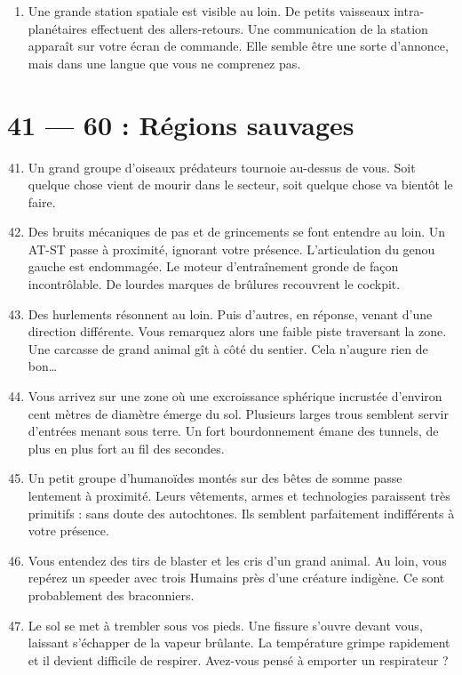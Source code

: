 \documentclass{article}
\begin{document}
\begin{enumerate}
	\item Une grande station spatiale est visible au loin. De petits vaisseaux intra-planétaires effectuent des allers-retours. Une communication de la station apparaît sur votre écran de commande. Elle semble être une sorte d’annonce, mais dans une langue que vous ne comprenez pas.
\end{enumerate}

\section*{41 --- 60 : Régions sauvages}
\begin{enumerate}
	\setcounter{enumi}{40}
	\item Un grand groupe d’oiseaux prédateurs tournoie au-dessus de vous. Soit quelque chose vient de mourir dans le secteur, soit quelque chose va bientôt le faire.
	\item Des bruits mécaniques de pas et de grincements se font entendre au loin. Un AT-ST passe à proximité, ignorant votre présence. L’articulation du genou gauche est endommagée. Le moteur d’entraînement gronde de façon incontrôlable. De lourdes marques de brûlures recouvrent le cockpit.
	\item Des hurlements résonnent au loin. Puis d’autres, en réponse, venant d’une direction différente. Vous remarquez alors une faible piste traversant la zone. Une carcasse de grand animal gît à côté du sentier. Cela n’augure rien de bon…
	\item Vous arrivez sur une zone où une excroissance sphérique incrustée d’environ cent mètres de diamètre émerge du sol. Plusieurs larges trous semblent servir d’entrées menant sous terre. Un fort bourdonnement émane des tunnels, de plus en plus fort au fil des secondes.
	\item Un petit groupe d’humanoïdes montés sur des bêtes de somme passe lentement à proximité. Leurs vêtements, armes et technologies paraissent très primitifs : sans doute des autochtones. Ils semblent parfaitement indifférents à votre présence.
	\item Vous entendez des tirs de blaster et les cris d’un grand animal. Au loin, vous repérez un speeder avec trois Humains près d’une créature indigène. Ce sont probablement des braconniers.
	\item Le sol se met à trembler sous vos pieds. Une fissure s’ouvre devant vous, laissant s’échapper de la vapeur brûlante. La température grimpe rapidement et il devient difficile de respirer. Avez-vous pensé à emporter un respirateur ?

\end{enumerate}
\end{document}
